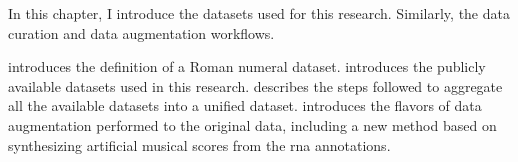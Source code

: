 
In this chapter, I introduce the datasets used for this
research. Similarly, the data curation and data augmentation
workflows.

 introduces the definition
of a Roman numeral dataset. 
introduces the publicly available datasets used in this
research.  describes
the steps followed to aggregate all the available datasets
into a unified dataset.  introduces
the flavors of data augmentation performed to the original
data, including a new method based on synthesizing
artificial musical scores from the \gls{rna} annotations.
